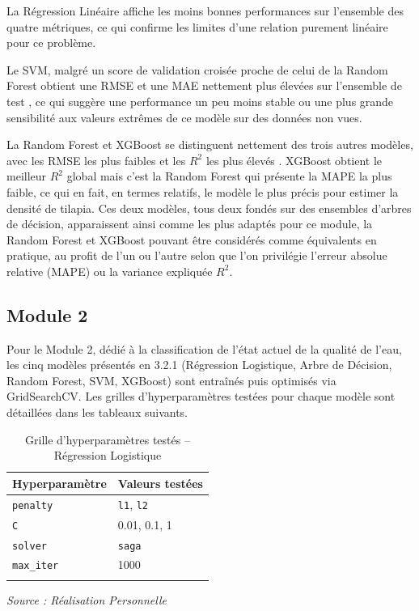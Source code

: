 \documentclass[a4paper,12pt, oneside]{article}
\begin{document}
La Régression Linéaire affiche les moins bonnes performances sur l'ensemble des quatre métriques, ce qui confirme les limites d'une relation purement linéaire pour ce problème.

Le SVM, malgré un score de validation croisée proche de celui de la Random Forest obtient une RMSE et une MAE nettement plus élevées sur l'ensemble de test , ce qui suggère une performance un peu moins stable ou une plus grande sensibilité aux valeurs extrêmes de ce modèle sur des données non vues.

La Random Forest et XGBoost se distinguent nettement des trois autres modèles, avec les RMSE les plus faibles et les $R^2$ les plus élevés . XGBoost obtient le meilleur $R^2$ global mais c'est la Random Forest qui présente la MAPE la plus faible, ce qui en fait, en termes relatifs, le modèle le plus précis pour estimer la densité de tilapia. Ces deux modèles, tous deux fondés sur des ensembles d'arbres de décision, apparaissent ainsi comme les plus adaptés pour ce module, la Random Forest et XGBoost pouvant être considérés comme équivalents en pratique, au profit de l'un ou l'autre selon que l'on privilégie l'erreur absolue relative (MAPE) ou la variance expliquée $R^2$.

\subsection{Module 2}

Pour le Module 2, dédié à la classification de l'état actuel de la qualité de l'eau, les cinq modèles présentés en 3.2.1 (Régression Logistique, Arbre de Décision, Random Forest, SVM, XGBoost) sont entraînés puis optimisés via GridSearchCV. Les grilles d'hyperparamètres testées pour chaque modèle sont détaillées dans les tableaux suivants.

\begin{longtable}{|p{3.5cm}|p{9.5cm}|}
\hline
\textbf{Hyperparamètre} & \textbf{Valeurs testées} \\
\hline
\texttt{penalty} & \texttt{l1}, \texttt{l2} \\
\hline
\texttt{C} & 0.01, 0.1, 1 \\
\hline
\texttt{solver} & \texttt{saga} \\
\hline
\texttt{max\_iter} & 1000 \\
\hline
\caption{Grille d'hyperparamètres testés -- Régression Logistique} \\
\end{longtable}
\begin{center}
\vspace{-0.85cm}
\textit{Source : Réalisation Personnelle}
\end{center}
\end{document}
